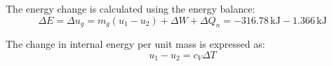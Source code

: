 The energy change is calculated using the energy balance:  
\[
\Delta E = \Delta u_g = m_g (u_1 - u_2) + \Delta W + \Delta Q_n = -316.78 \, \text{kJ} - 1.366 \, \text{kJ}
\]  

The change in internal energy per unit mass is expressed as:  
\[
u_1 - u_2 = c_V \Delta T
\]